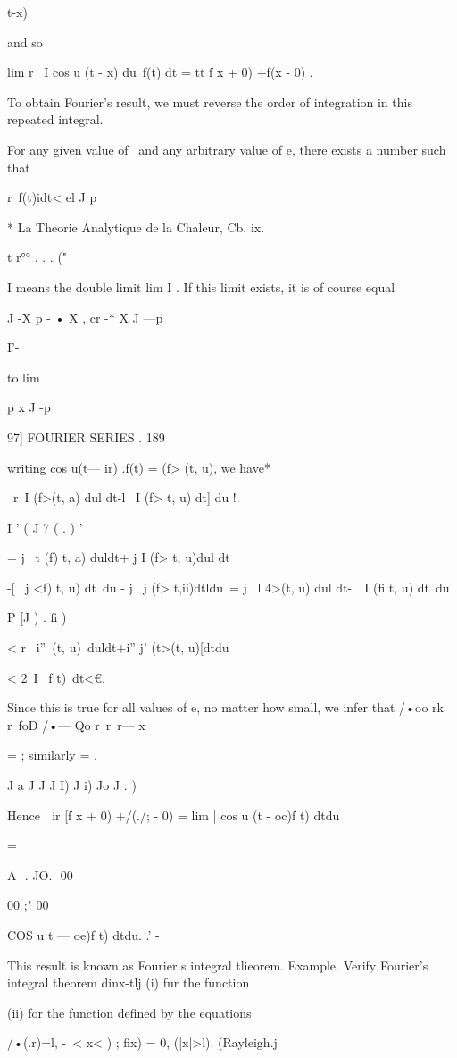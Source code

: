 { t-x)

and so

lim r \ I cos u (t - x) du\ f(t) dt = tt f x + 0) +f(x - 0) .

To obtain Fourier's result, we must reverse the order of integration
in this repeated integral.

For any given value of \ and any arbitrary value of e, there exists a
number such that

r\ f(t)idt< el J p

* La Theorie Analytique de la Chaleur, Cb. ix.

t r°° . . . ("

I means the double limit lim I . If this limit exists, it is of course
equal

J -X p - • X , cr -* X J —p

I'-

to lim

p x J -p

97] FOURIER SERIES . 189

writing cos u(t— ir) .f(t) = (f> (t, u), we have*

\ r\ I (f>(t, a) dul dt-l \ I (f> t, u) dt] du !

I ' ( J 7 ( . ) '

= j \ t (f) t, a) duldt+ j I (f> t, u)dul dt

-[ \ j <f) t, u) dt\ du - j \ j (f> t,ii)dtldu\ = j \ l 4>(t, u) dul
dt-\ \ I (fi t, u) dt\ du

  P [J ) . fi )

< r \ i''\ < t>(t, u)\ duldt+i'' j' (t>(t, u)[dtdu

< 2\ I \ f t)\ dt<€.

Since this is true for all values of e, no matter how small, we infer
that /•oo rk r\ foD /•— Qo r\ r\ r— x

= ; similarly = .

J a J J J I) J i) Jo J . )

Hence | ir [f x + 0) +/(./; - 0) = lim | cos u (t - oc)f t) dtdu

=

A- . JO. -00

00 ;" 00

COS u t — oe)f t) dtdu. .' -

This result is known as Fourier s integral tlieorem. Example. Verify
Fourier's integral theorem dinx-tlj (i) fur the function

(ii) for the function defined by the equations

/•(.r)=l, -\ < x< ) ; fix) = 0, (|x|>l). (Rayleigh.j

}
